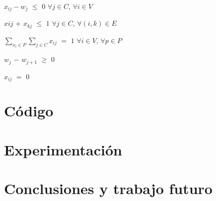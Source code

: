 \documentclass[a4paper]{article}
\begin{document}
$x_{ij} - w_j$ $\leq$ $0$   $\forall j \in C$, $\forall i \in V$

$x{ij}$ $+$ $x_{kj}$ $\leq$ $1$   $\forall j \in C$, $\forall (i,k) \in E$

$\sum_{x_i \in P} \sum_{j \in C} x_{ij}$ $=$ $1$  $\forall i \in V$, $\forall p \in P$

$w_j$ $-$ $w_{j+1}$ $\geq$ $0$

$x_{ij}$ $=$ $0$


\newpage

\section{Código}



\newpage

\section{Experimentación}

\newpage

\section{Conclusiones y trabajo futuro} 
\end{document}
